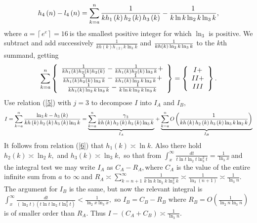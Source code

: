\documentclass{article}
\newenvironment{proof}[1][Proof]{}{}
\begin{document}
\begin{proof}
\begin{equation*}
h_{4}\left( n\right) -l_{4}\left( n\right) =\sum_{k=a}^{n}\frac{1}{%
kh_{1}\left( k\right) h_{2}\left( k\right) h_{3}\left( k\right) }-\frac{1}{%
k\ln k\ln _{2}k\ln _{3}k},
\end{equation*}%
where $a=\left\lceil e^{e}\right\rceil =16\ $is the smallest positive
integer for which $\ln _{3}$ is positive. We subtract and add successively $%
\frac{1}{kh\left( k\right) h_{\left( 2\right) }k\ln _{3}k}$ and $\frac{1}{%
kh\left( k\right) \ln _{2}k\ln _{3}k}$ to the $k$th summand, getting%
\begin{equation*}
\sum_{k=a}^{n}\left\{ 
\begin{array}{c}
\frac{1}{kh_{1}\left( k\right) h_{2}\left( k\right) h_{3}\left( k\right) }-%
\frac{1}{kh_{1}\left( k\right) h_{2}\left( k\right) \ln _{3}k}+ \\ 
\frac{1}{kh_{1}\left( k\right) h_{2}\left( k\right) \ln _{3}k}-\frac{1}{%
kh_{1}\left( k\right) \ln _{2}k\ln _{3}k}+ \\ 
\frac{1}{kh_{1}\left( k\right) \ln _{2}k\ln _{3}k}-\frac{1}{k\ln k\ln
_{2}k\ln _{3}k}%
\end{array}%
\right\} =\left\{ 
\begin{array}{c}
I+ \\ 
II+ \\ 
III%
\end{array}%
\right\} .
\end{equation*}%
Use relation (\ref{5}) with $j=3$ to decompose $I$ into $I_{A}$ and $I_{B},$%
\begin{equation*}
I=\sum_{k=a}^{n}\frac{\ln _{3}k-h_{3}\left( k\right) }{kh\left( k\right)
h_{2}\left( k\right) h_{3}\left( k\right) \ln _{3}k}=\underset{I_{A}}{%
\underbrace{\sum_{k=a}^{n}\frac{\gamma _{3}}{kh\left( k\right) h_{2}\left(
k\right) h_{3}\left( k\right) \ln _{3}k}}}+\underset{I_{B}}{\underbrace{%
\sum_{k=a}^{n}O\left( \frac{1}{kh\left( k\right) h_{2}\left( k\right)
h_{3}\left( k\right) \ln _{3}k\ln _{2}k}\right) }}
\end{equation*}%
It follows from relation (\ref{6}) that $h_{1}\left( k\right) \asymp \ln k.$
Also there hold $h_{2}\left( k\right) \asymp \ln _{2}k,$ and $h_{3}\left(
k\right) \asymp \ln _{3}k,$ so that from $\int_{x}^{\infty }\frac{dt}{t\ln
t\ln _{2}t\ln _{3}^{2}t}=\frac{1}{\ln _{3}x}\ $and the integral test we may
write $I_{A}$ as $C_{A}-R_{A},$where $C_{A}$ is the value of the entire
infinite sum from $a$ to $\infty \ $and $R_{A}\asymp \sum_{k=n+1}^{\infty }%
\frac{1}{k\ln k\ln _{2}k\ln _{3}^{2}k}\asymp \frac{1}{\ln _{3}\left(
n+1\right) }\asymp \frac{1}{\ln _{3}n}.$ The argument for $I_{B}$ is the
same, but now the relevant integral is $\int_{x}^{\infty }\frac{dt}{\left(
\ln _{2}t\right) \left( t\ln t\ln _{2}t\ln _{3}^{2}t\right) }<\frac{1}{\ln
_{2}x\ln _{3}x},$ so $I_{B}=C_{B}-R_{B}$ where $R_{B}=O\left( \frac{1}{\ln
_{2}n\ln _{3}n}\right) $ is of smaller order than $R_{A}.$ Thus $%
I-(C_{A}+C_{B})\asymp \frac{1}{\ln _{3}n}.$


\end{proof}
\end{document}

